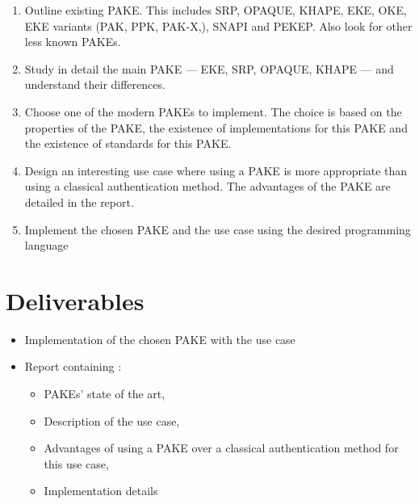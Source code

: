 ﻿\documentclass[../report.tex]{subfiles}
\begin{document}
\begin{enumerate}
 \item Outline existing PAKE. This includes SRP, OPAQUE, KHAPE, EKE, OKE, EKE variants (PAK, PPK, PAK-X,), SNAPI and PEKEP. Also look for other less known PAKEs.
 \item Study in detail the main PAKE --- EKE, SRP, OPAQUE, KHAPE --- and understand their differences.
 \item Choose one of the modern PAKEs to implement. The choice is based on the properties of the PAKE, the existence of implementations for this PAKE and the existence of standards for this PAKE.
 \item Design an interesting use case where using a PAKE is more appropriate than using a classical authentication method. The advantages of the PAKE are detailed in the report.
 \item Implement the chosen PAKE and the use case using the desired programming language
\end{enumerate}



\section*{Deliverables}
\begin{itemize}
 \item Implementation of the chosen PAKE with the use case
 \item Report containing :
 \begin{itemize}
    \item PAKEs' state of the art,
    \item Description of the use case,
    \item Advantages of using a PAKE over a classical authentication method for this use case,
    \item Implementation details
 \end{itemize}
\end{itemize}
\end{document}
